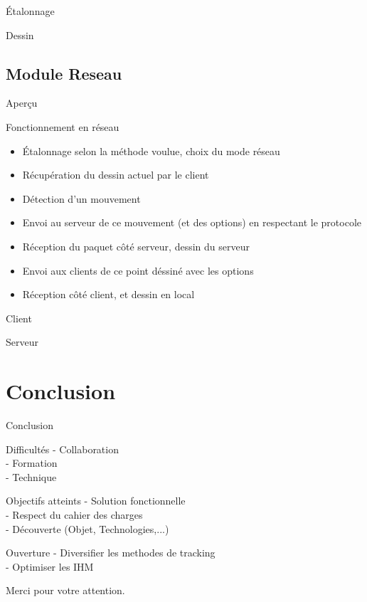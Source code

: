 \documentclass{beamer}
\begin{document}
		\begin{frame}{Étalonnage}
		\end{frame}
		\begin{frame}{Dessin}
		\end{frame}

	\subsection{Module Reseau}
		\begin{frame}{Aperçu}
		\begin{block}{Fonctionnement en réseau}
			\begin{itemize}
			\item Étalonnage selon la méthode voulue, choix du mode réseau
			\item Récupération du dessin actuel par le client
			\item Détection d'un mouvement
			\item Envoi au serveur de ce mouvement (et des options) en respectant le protocole
			\item Réception du paquet côté serveur, dessin du serveur
			\item Envoi aux clients de ce point déssiné avec les options
			\item Réception côté client, et dessin en local
			\end{itemize}
		\end{block}
		\end{frame}
		
		\begin{frame}{Client}
		\end{frame}
		\begin{frame}{Serveur}
		\end{frame}

	\section{Conclusion}
		\begin{frame}{Conclusion}
			\begin{alertblock}{Difficultés}
				- Collaboration \\
				- Formation \\
				- Technique 
			\end{alertblock}
			\pause
			\begin{exampleblock}{Objectifs atteints}
				- Solution fonctionnelle \\
				- Respect du cahier des charges \\
				- Découverte (Objet, Technologies,...) 
			\end{exampleblock}
			\pause
			\begin{block}{Ouverture}
				- Diversifier les methodes de tracking\\
				- Optimiser les IHM \\
			\end{block}
		\end{frame}
	
	\begin{frame}
		\begin{center}
			\huge{Merci pour votre attention.} \\
		\end{center}
	\end{frame}
\end{document}
